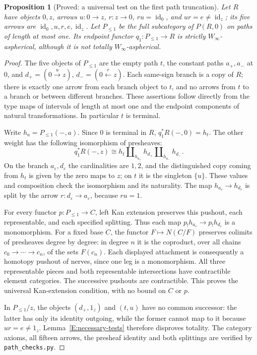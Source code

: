 \documentclass[11pt,a4paper]{article}
\newtheorem{proposition}[theorem]{Proposition}
\theoremstyle{definition}
\theoremstyle{remark}
\begin{document}
\begin{proposition}[Proved: a universal test on the first path truncation]
\label{E:retraction-truncation}
Let $R$ have objects $0,z$, arrows $u:0\to z$, $r:z\to0$,
$ru=\operatorname{id}_0$, and $ur=e\ne\operatorname{id}_z$; its five
arrows are $\operatorname{id}_0,u,r,e,\operatorname{id}_z$.  Let
$P_{\leq1}$ be the full subcategory of $P(R,0)$ on paths of length at
most one.  Its endpoint functor $q_1:P_{\leq1}\to R$ is strictly
$W_\infty$-aspherical, although it is not totally
$W_\infty$-aspherical.
\end{proposition}
\begin{proof}
The five objects of $P_{\leq1}$ are the empty path $t$, the constant
paths $a_+,a_-$ at $0$, and $d_+=(0\xrightarrow{u}z)$,
$d_-=(0\xleftarrow{r}z)$.  Each same-sign branch is a copy of $R$;
there is exactly one arrow from each branch object to $t$, and no
arrows from $t$ to a branch or between different branches.  These
assertions follow directly from the type maps of intervals of length
at most one and the endpoint components of natural transformations.
In particular $t$ is terminal.

Write $h_a=P_{\leq1}(-,a)$.  Since $0$ is terminal in $R$,
$q_1^*R(-,0)=h_t$.  The other weight has the following isomorphism of
presheaves:
\[
q_1^*R(-,z)\cong
 h_t\amalg_{h_{a_+}}h_{d_+}\amalg_{h_{a_-}}h_{d_-}.
\]
On the branch $a_\varepsilon,d_\varepsilon$ the cardinalities are
$1,2$, and the distinguished copy coming from $h_t$ is given by the
zero maps to $z$; on $t$ it is the singleton $\{u\}$.  These values
and composition check the isomorphism and its naturality.  The map
$h_{a_\varepsilon}\to h_{d_\varepsilon}$ is split by the arrow
$r:d_\varepsilon\to a_\varepsilon$, because $ru=1$.

For every functor $p:P_{\leq1}\to C$, left Kan extension preserves
this pushout, each representable, and each specified splitting.  Thus
each map $p_!h_{a_\varepsilon}\to p_!h_{d_\varepsilon}$ is a
monomorphism.  For a fixed base $C$, the functor
$F\mapsto N(C/F)$ preserves colimits of presheaves degree by degree:
in degree $n$ it is the coproduct, over all chains
$c_0\to\cdots\to c_n$, of the sets $F(c_n)$.  Each displayed
attachment is consequently a homotopy pushout of nerves, since one
leg is a monomorphism.  All three representable pieces and both
representable intersections have contractible element categories.
The successive pushouts are contractible.  This proves the universal
Kan-extension condition, with no bound on $C$ or $p$.

In $P_{\leq1}/z$, the objects $(d_+,1_z)$ and $(t,u)$ have no common
successor: the latter has only its identity outgoing, while the former
cannot map to it because $ur=e\ne1_z$.  Lemma~\ref{E:necessary-tests}
therefore disproves totality.  The category axioms, all fifteen arrows,
the presheaf identity and both splittings are verified by
\texttt{path\_checks.py}.
\end{proof}
\end{document}
